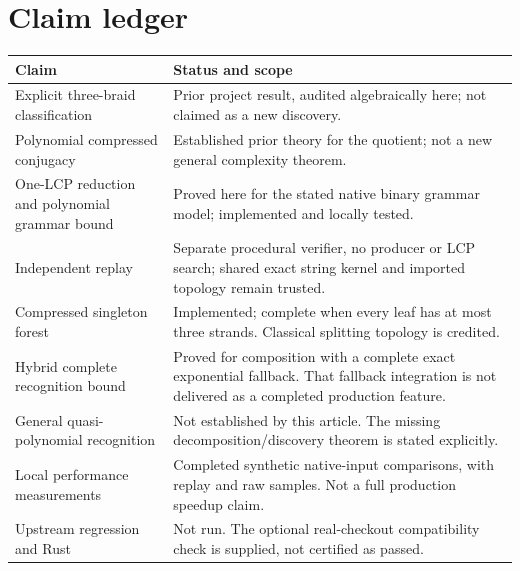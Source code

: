 \documentclass[11pt,letterpaper]{article}
\theoremstyle{definition}\newtheorem{definition}[theorem]{Definition}
\theoremstyle{remark}\newtheorem{remark}[theorem]{Remark}
\begin{document}
\section{Claim ledger}
\begin{longtable}{@{}p{.28\linewidth}p{.65\linewidth}@{}}
\toprule
Claim & Status and scope \\\midrule\endhead
Explicit three-braid classification & Prior project result, audited algebraically here; not claimed as a new discovery.\\[4pt]
Polynomial compressed conjugacy & Established prior theory for the quotient; not a new general complexity theorem.\\[4pt]
One-LCP reduction and polynomial grammar bound & Proved here for the stated native binary grammar model; implemented and locally tested.\\[4pt]
Independent replay & Separate procedural verifier, no producer or LCP search; shared exact string kernel and imported topology remain trusted.\\[4pt]
Compressed singleton forest & Implemented; complete when every leaf has at most three strands. Classical splitting topology is credited.\\[4pt]
Hybrid complete recognition bound & Proved for composition with a complete exact exponential fallback. That fallback integration is not delivered as a completed production feature.\\[4pt]
General quasi-polynomial recognition & Not established by this article. The missing decomposition/discovery theorem is stated explicitly.\\[4pt]
Local performance measurements & Completed synthetic native-input comparisons, with replay and raw samples. Not a full production speedup claim.\\[4pt]
Upstream regression and Rust & Not run. The optional real-checkout compatibility check is supplied, not certified as passed.\\
\bottomrule
\end{longtable}
\end{document}
